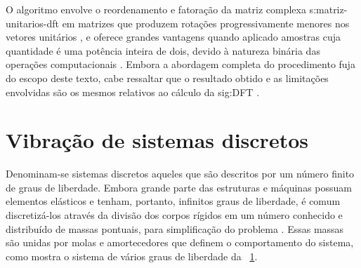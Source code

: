 \documentclass[12pt,oneside,english,brazil,lmodern,siglas,simbolos,cite=num]{ucsmonograph}
\begin{document}
	O algoritmo envolve o reordenamento e fatoração da matriz complexa \gls{s:matriz-unitarios-dft} em matrizes que produzem rotações progressivamente menores nos vetores unitários \cite{randall:1987}, e oferece grandes vantagens quando aplicado amostras cuja quantidade é uma potência inteira de dois, devido à natureza binária das operações computacionais \cite{cooley:1965}.
	Embora a abordagem completa do procedimento fuja do escopo deste texto, cabe ressaltar que o resultado obtido e as limitações envolvidas são os mesmos relativos ao cálculo da \gls{sig:DFT} \cite{randall:1987}.
	
	\section{Vibração de sistemas discretos} \label{sec:disc}
	Denominam-se sistemas discretos aqueles que são descritos por um número finito de graus de liberdade.
	Embora grande parte das estruturas e máquinas possuam elementos elásticos e tenham, portanto, infinitos graus de liberdade, é comum discretizá-los através da divisão dos corpos rígidos em um número conhecido e distribuído de massas pontuais, para simplificação do problema \cite{rao:2008}.
	Essas massas são unidas por molas e amortecedores que definem o comportamento do sistema, como mostra o sistema de vários graus de liberdade da \figurename\ \ref{fig:sistema-varios-dof}.
	
	\begin{figure}[t]
		\label{fig:sistema-varios-dof}
	\end{figure}
	
\end{document}
